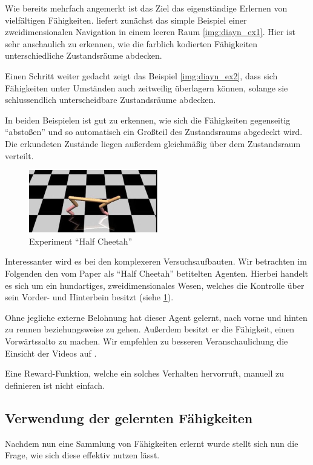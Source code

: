 Wie bereits mehrfach angemerkt ist das Ziel das eigenständige Erlernen von vielfältigen Fähigkeiten. \cite{diversity_eysenbach} liefert zunächst das simple Beispiel einer zweidimensionalen Navigation in einem leeren Raum \ref{img:diayn_ex1}. Hier ist sehr anschaulich zu erkennen, wie die farblich kodierten Fähigkeiten unterschiedliche Zustandsräume abdecken.

Einen Schritt weiter gedacht zeigt das Beispiel \ref{img:diayn_ex2}, dass sich Fähigkeiten unter Umständen auch zeitweilig überlagern können, solange sie schlussendlich unterscheidbare Zustandsräume abdecken.

\smallspace

In beiden Beispielen ist gut zu erkennen, wie sich die Fähigkeiten gegenseitig ``abstoßen'' und so automatisch ein Großteil des Zustandsraums abgedeckt wird. Die erkundeten Zustände liegen außerdem gleichmäßig über dem Zustandsraum verteilt.

\smallspace

\begin{figure}[h]
\includegraphics[width=0.5\textwidth, keepaspectratio=true, center]{images/cheetah_image.JPG}
\caption{Experiment ``Half Cheetah''} \label{img:cheetah_ex}
\end{figure}

Interessanter wird es bei den komplexeren Versuchsaufbauten. Wir betrachten im Folgenden den vom Paper \cite{diversity_eysenbach} als ``Half Cheetah'' betitelten Agenten. Hierbei handelt es sich um ein hundartiges, zweidimensionales Wesen, welches die Kontrolle über sein Vorder- und Hinterbein besitzt (siehe \ref{img:cheetah_ex}).

Ohne jegliche externe Belohnung hat dieser Agent gelernt, nach vorne und hinten zu rennen beziehungsweise zu gehen. Außerdem besitzt er die Fähigkeit, einen Vorwärtssalto zu machen. Wir empfehlen zu besseren Veranschaulichung die Einsicht der Videos auf \cite{diversity_web}.

Eine Reward-Funktion, welche ein solches Verhalten hervorruft, manuell zu definieren ist nicht einfach.

\subsection{Verwendung der gelernten Fähigkeiten}
\label{sec:diversityusage}
Nachdem nun eine Sammlung von Fähigkeiten erlernt wurde stellt sich nun die Frage, wie sich diese effektiv nutzen lässt.

